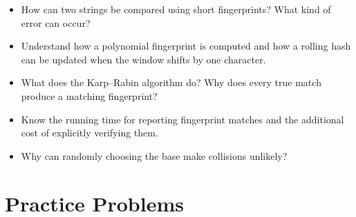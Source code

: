 \documentclass[11 pt]{exam}
\begin{document}
	\begin{itemize}
		\item How can two strings be compared using short fingerprints? What kind of error can occur?
		\item Understand how a polynomial fingerprint is computed and how a rolling hash can be updated when the window shifts by one character.
		\item What does the Karp--Rabin algorithm do? Why does every true match produce a matching fingerprint?
		\item Know the running time for reporting fingerprint matches and the additional cost of explicitly verifying them.
		\item Why can randomly choosing the base make collisions unlikely? 
	\end{itemize}

	\section{Practice Problems}
\end{document}

